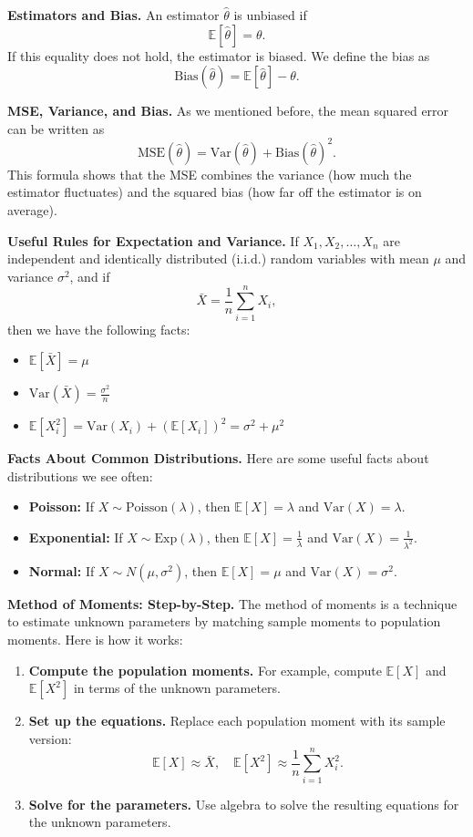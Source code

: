 \documentclass[11pt,letterpaper]{article}
\theoremstyle{remark}
\begin{document}
\newpage

\textbf{Estimators and Bias.}
An estimator $\hat{\theta}$ is unbiased if
\[
\mathbb{E}[\hat{\theta}] = \theta.
\]
If this equality does not hold, the estimator is biased. We define the bias as
\[
\text{Bias}(\hat{\theta}) = \mathbb{E}[\hat{\theta}] - \theta.
\]

\textbf{MSE, Variance, and Bias.}
As we mentioned before, the mean squared error can be written as
\[
\text{MSE}(\hat{\theta}) = \text{Var}(\hat{\theta}) + \text{Bias}(\hat{\theta})^2.
\]
This formula shows that the MSE combines the variance (how much the estimator fluctuates) and the squared bias (how far off the estimator is on average).

\textbf{Useful Rules for Expectation and Variance.}
If $X_1, X_2, \ldots, X_n$ are independent and identically distributed (i.i.d.) random variables with mean $\mu$ and variance $\sigma^2$, and if
\[
\bar{X} = \frac{1}{n} \sum_{i=1}^{n} X_i,
\]
then we have the following facts:
\begin{itemize}
    \item $\mathbb{E}[\bar{X}] = \mu$
    \item $\text{Var}(\bar{X}) = \frac{\sigma^2}{n}$
    \item $\mathbb{E}[X_i^2] = \text{Var}(X_i) + (\mathbb{E}[X_i])^2 = \sigma^2 + \mu^2$
\end{itemize}

\textbf{Facts About Common Distributions.}
Here are some useful facts about distributions we see often:
\begin{itemize}
    \item \textbf{Poisson:} If $X \sim \text{Poisson}(\lambda)$, then $\mathbb{E}[X] = \lambda$ and $\text{Var}(X) = \lambda$.
    \item \textbf{Exponential:} If $X \sim \text{Exp}(\lambda)$, then $\mathbb{E}[X] = \frac{1}{\lambda}$ and $\text{Var}(X) = \frac{1}{\lambda^2}$.
    \item \textbf{Normal:} If $X \sim N(\mu, \sigma^2)$, then $\mathbb{E}[X] = \mu$ and $\text{Var}(X) = \sigma^2$.
\end{itemize}

\textbf{Method of Moments: Step-by-Step.}
The method of moments is a technique to estimate unknown parameters by matching sample moments to population moments. Here is how it works:
\begin{enumerate}
    \item \textbf{Compute the population moments.} For example, compute $\mathbb{E}[X]$ and $\mathbb{E}[X^2]$ in terms of the unknown parameters.
    \item \textbf{Set up the equations.} Replace each population moment with its sample version:
    \[
    \mathbb{E}[X] \approx \bar{X}, \quad \mathbb{E}[X^2] \approx \frac{1}{n} \sum_{i=1}^{n} X_i^2.
    \]
    \item \textbf{Solve for the parameters.} Use algebra to solve the resulting equations for the unknown parameters.
\end{enumerate}
\end{document}
